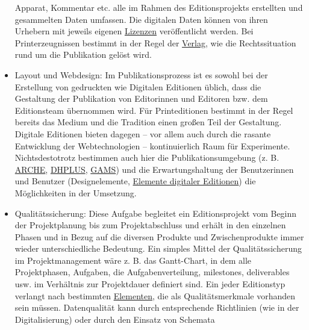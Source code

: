 \documentclass{article}
\begin{document}
\begin{itemize}
{                     Apparat, Kommentar etc. alle im Rahmen des Editionsprojekts erstellten und
                     gesammelten Daten umfassen. Die digitalen Daten können von ihren Urhebern mit jeweils eigenen \href{http://gams.uni-graz.at/o:konde.118}{Lizenzen} veröffentlicht werden.
                     Bei Printerzeugnissen bestimmt in der Regel der \href{http://gams.uni-graz.at/o:konde.208}{Verlag}, wie die Rechtssituation rund um die
                     Publikation gelöst wird. }\item {Layout und Webdesign: Im Publikationsprozess ist es sowohl bei der
                     Erstellung von gedruckten wie Digitalen Editionen üblich, dass die Gestaltung
                     der Publikation von Editorinnen und Editoren bzw. dem Editionsteam übernommen
                     wird. Für Printeditionen bestimmt in der Regel bereits das Medium und die
                     Tradition einen großen Teil der Gestaltung. Digitale Editionen bieten dagegen –
                     vor allem auch durch die rasante Entwicklung der Webtechnologien –
                     kontinuierlich Raum für Experimente. Nichtsdestotrotz bestimmen auch hier die
                     Publikationsumgebung (z. B. \href{http://gams.uni-graz.at/o:konde.67}{ARCHE}, \href{http://gams.uni-graz.at/o:konde.68}{DHPLUS}, \href{http://gams.uni-graz.at/o:konde.70}{GAMS}) und die Erwartungshaltung
                     der Benutzerinnen und Benutzer (Designelemente, \href{http://gams.uni-graz.at/o:konde.80}{Elemente
                        digitaler Editionen}) die Möglichkeiten in der Umsetzung. }\item { Qualitätssicherung: Diese Aufgabe begleitet ein Editionsprojekt vom Beginn
                     der Projektplanung bis zum Projektabschluss und erhält in den einzelnen Phasen
                     und in Bezug auf die diversen Produkte und Zwischenprodukte immer wieder
                     unterschiedliche Bedeutung. Ein simples Mittel der Qualitätssicherung im
                     Projektmanagement wäre z. B. das Gantt-Chart, in dem alle Projektphasen,
                     Aufgaben, die Aufgabenverteilung, milestones, deliverables usw. im Verhältnis
                     zur Projektdauer definiert sind. Ein jeder Editionstyp verlangt nach bestimmten
                        \href{http://gams.uni-graz.at/o:konde.80}{Elementen}, die als
                     Qualitätsmerkmale vorhanden sein müssen. Datenqualität kann durch entsprechende
                     Richtlinien (wie in der Digitalisierung) oder durch den Einsatz von Schemata
}
\end{itemize}
\end{document}
